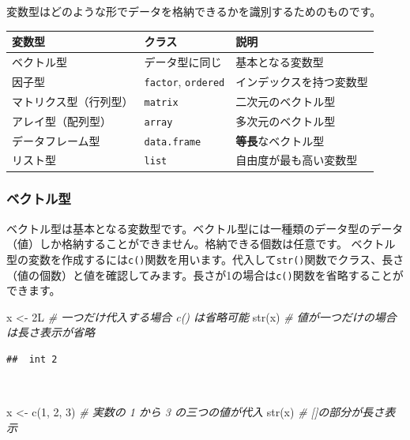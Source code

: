 \documentclass[
  12pt,
]{book}
\newenvironment{Shaded}{\begin{snugshade}}{\end{snugshade}}
\newcommand{\CommentTok}[1]{\textcolor[rgb]{0.56,0.35,0.01}{\textit{#1}}}
\newcommand{\DecValTok}[1]{\textcolor[rgb]{0.00,0.00,0.81}{#1}}
\newcommand{\FunctionTok}[1]{\textcolor[rgb]{0.00,0.00,0.00}{#1}}
\newcommand{\NormalTok}[1]{#1}
\newcommand{\OtherTok}[1]{\textcolor[rgb]{0.56,0.35,0.01}{#1}}
\begin{document}
変数型はどのような形でデータを格納できるかを識別するためのものです。

\begin{longtable}[]{@{}lll@{}}
\toprule
変数型 & クラス & 説明 \\
\midrule
\endhead
ベクトル型 & データ型に同じ & 基本となる変数型 \\
因子型 & \texttt{factor}, \texttt{ordered} & インデックスを持つ変数型 \\
マトリクス型（行列型） & \texttt{matrix} & 二次元のベクトル型 \\
アレイ型（配列型） & \texttt{array} & 多次元のベクトル型 \\
データフレーム型 & \texttt{data.frame} & \textbf{等長}なベクトル型 \\
リスト型 & \texttt{list} & 自由度が最も高い変数型 \\
\bottomrule
\end{longtable}

\hypertarget{ux30d9ux30afux30c8ux30ebux578b}{%
\subsubsection{ベクトル型}\label{ux30d9ux30afux30c8ux30ebux578b}}

ベクトル型は基本となる変数型です。ベクトル型には一種類のデータ型のデータ（値）しか格納することができません。格納できる個数は任意です。 ベクトル型の変数を作成するには\texttt{c()}関数を用います。代入して\texttt{str()}関数でクラス、長さ（値の個数）と値を確認してみます。長さが1の場合は\texttt{c()}関数を省略することができます。

\begin{Shaded}
\begin{Highlighting}[]
\NormalTok{x }\OtherTok{\textless{}{-}}\NormalTok{ 2L                 }\CommentTok{\# 一つだけ代入する場合 \textasciigrave{}c()\textasciigrave{} は省略可能}
\FunctionTok{str}\NormalTok{(x)                  }\CommentTok{\# 値が一つだけの場合は長さ表示が省略}
\end{Highlighting}
\end{Shaded}

\begin{verbatim}
##  int 2
\end{verbatim}

　

\begin{Shaded}
\begin{Highlighting}[]
\NormalTok{x }\OtherTok{\textless{}{-}} \FunctionTok{c}\NormalTok{(}\DecValTok{1}\NormalTok{, }\DecValTok{2}\NormalTok{, }\DecValTok{3}\NormalTok{)         }\CommentTok{\# 実数の 1 から 3 の三つの値が代入}
\FunctionTok{str}\NormalTok{(x)                  }\CommentTok{\# []の部分が長さ表示}
\end{Highlighting}
\end{Shaded}
\end{document}
